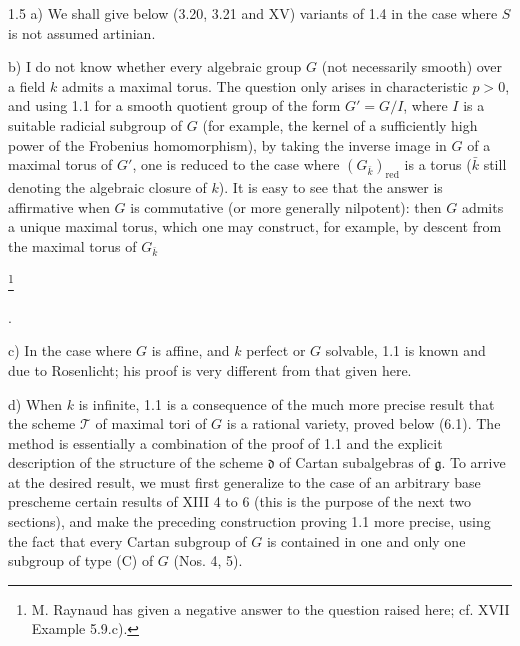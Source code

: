 \begin{remarks}{1.5}\label{XIV.1.5}
\noindent a) We shall give below (3.20, 3.21 and XV) variants of 1.4
in the case where $S$ is not assumed artinian.

\noindent b) I do not know whether every algebraic group $G$
(not necessarily smooth) over a field $k$ admits a maximal torus.
The question only arises in characteristic $p>0$, and using 1.1 for
a smooth quotient group of the form $G'=G/I$, where $I$ is a suitable
radicial subgroup of $G$ (for example, the kernel of a sufficiently
high power of the Frobenius homomorphism), by taking the inverse image
in $G$ of a maximal torus of $G'$, one is reduced to the case where
$(G_{\bar k})_{\mathrm{red}}$ is a torus ($\bar k$ still denoting the
algebraic closure of $k$). It is easy to see that the answer is
affirmative when $G$ is commutative (or more generally nilpotent):
then $G$ admits a unique maximal torus, which one may construct,
for example, by descent from the maximal torus of $G_{\bar k}$%
{\renewcommand{\thefootnote}{*}\footnote{M. Raynaud has given a negative
answer to the question raised here; cf. XVII Example 5.9.c).}\addtocounter{footnote}{-1}}.

\noindent c) In the case where $G$ is affine, and $k$ perfect or $G$
solvable, 1.1 is known and due to Rosenlicht; his proof is very different
from that given here.

\noindent d) When $k$ is infinite, 1.1 is a consequence of the much
more precise result that the scheme $\mathcal T$ of maximal tori of
$G$ is a rational variety, proved below (6.1). The method is essentially
a combination of the proof of 1.1 and the explicit description of the
structure of the scheme $\mathfrak d$ of Cartan subalgebras of
$\mathfrak g$. To arrive at the desired result, we must first generalize
to the case of an arbitrary base prescheme certain results of XIII 4
to 6 (this is the purpose of the next two sections), and make the
preceding construction proving 1.1 more precise, using the fact that
every Cartan subgroup of $G$ is contained in one and only one subgroup
of type (C) of $G$ (Nos. 4, 5).
\end{remarks}

